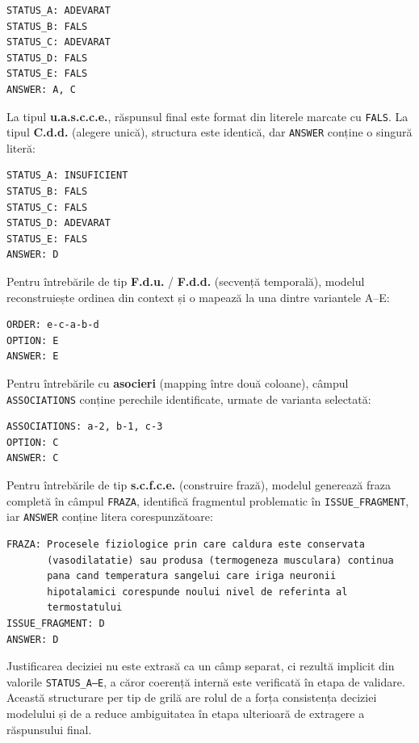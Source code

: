 \documentclass[12pt, a4paper, oneside, romanian]{teza-upb}
\begin{document}
\begin{verbatim}
STATUS_A: ADEVARAT
STATUS_B: FALS
STATUS_C: ADEVARAT
STATUS_D: FALS
STATUS_E: FALS
ANSWER: A, C
\end{verbatim}

La tipul \textbf{u.a.s.c.c.e.}, răspunsul final este format din literele marcate cu \texttt{FALS}. La tipul \textbf{C.d.d.} (alegere unică), structura este identică, dar \texttt{ANSWER} conține o singură literă:

\begin{verbatim}
STATUS_A: INSUFICIENT
STATUS_B: FALS
STATUS_C: FALS
STATUS_D: ADEVARAT
STATUS_E: FALS
ANSWER: D
\end{verbatim}

Pentru întrebările de tip \textbf{F.d.u.} / \textbf{F.d.d.} (secvență temporală), modelul reconstruiește ordinea din context și o mapează la una dintre variantele A--E:

\begin{verbatim}
ORDER: e-c-a-b-d
OPTION: E
ANSWER: E
\end{verbatim}

Pentru întrebările cu \textbf{asocieri} (mapping între două coloane), câmpul \texttt{ASSOCIATIONS} conține perechile identificate, urmate de varianta selectată:

\begin{verbatim}
ASSOCIATIONS: a-2, b-1, c-3
OPTION: C
ANSWER: C
\end{verbatim}

Pentru întrebările de tip \textbf{s.c.f.c.e.} (construire frază), modelul generează fraza completă în câmpul \texttt{FRAZA}, identifică fragmentul problematic în \texttt{ISSUE\_FRAGMENT}, iar \texttt{ANSWER} conține litera corespunzătoare:

\begin{verbatim}
FRAZA: Procesele fiziologice prin care caldura este conservata
       (vasodilatatie) sau produsa (termogeneza musculara) continua
       pana cand temperatura sangelui care iriga neuronii
       hipotalamici corespunde noului nivel de referinta al
       termostatului
ISSUE_FRAGMENT: D
ANSWER: D
\end{verbatim}

Justificarea deciziei nu este extrasă ca un câmp separat, ci rezultă implicit din valorile \texttt{STATUS\_A--E}, a căror coerență internă este verificată în etapa de validare. Această structurare per tip de grilă are rolul de a forța consistența deciziei modelului și de a reduce ambiguitatea în etapa ulterioară de extragere a răspunsului final.
\end{document}
